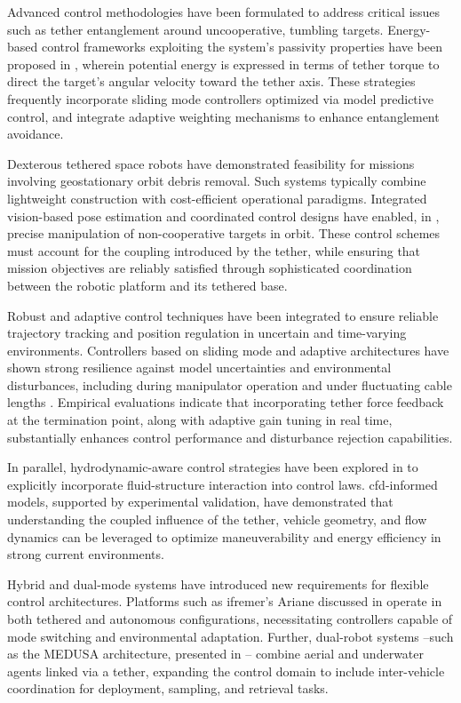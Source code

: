Advanced control methodologies have been formulated to address critical issues such as tether
entanglement around uncooperative, tumbling targets. Energy-based control frameworks exploiting the
system's passivity properties have been proposed in \cite{wangAntitangleControlTethered2019},
wherein potential energy is expressed in terms of tether torque to direct the target's angular
velocity toward the tether axis. These strategies frequently incorporate sliding mode controllers
optimized via model predictive control, and integrate adaptive weighting mechanisms to enhance
entanglement avoidance.

Dexterous tethered space robots have demonstrated feasibility for missions involving geostationary
orbit debris removal. Such systems typically combine lightweight construction with cost-efficient
operational paradigms. Integrated vision-based pose estimation and coordinated control designs have
enabled, in \cite{huangDexterousTetheredSpace2017}, precise manipulation of non-cooperative targets
in orbit. These control schemes must account for the coupling introduced by the tether, while
ensuring that mission objectives are reliably satisfied through sophisticated coordination between
the robotic platform and its tethered base.

Robust and adaptive control techniques have been integrated to ensure reliable trajectory tracking
and position regulation in uncertain and time-varying environments. Controllers based on sliding
mode and  adaptive architectures have shown strong resilience against model
uncertainties and environmental disturbances, including during manipulator operation and under
fluctuating cable lengths
\parencite{soyluDynamicsControlTethered2010,maaloufNovelApplicationMultivariable2012}. Empirical
evaluations indicate that incorporating tether force feedback at the termination point, along with
adaptive gain tuning in real time, substantially enhances control performance and disturbance
rejection capabilities.

In parallel, hydrodynamic-aware control strategies have been explored in
\cite{wuManeuverabilityHydrodynamicsTethered2021} to explicitly incorporate fluid-structure
interaction into control laws. \Ac{cfd}-informed models, supported by experimental validation, have
demonstrated that understanding the coupled influence of the tether, vehicle geometry, and flow
dynamics can be leveraged to optimize maneuverability and energy efficiency in strong current
environments.

Hybrid and dual-mode systems have introduced new requirements for flexible control architectures.
Platforms such as \ac{ifremer}'s Ariane discussed in \cite{brignoneFirstSeaTrials2015} operate in
both tethered and autonomous configurations, necessitating controllers capable of mode switching
and environmental adaptation. Further, dual-robot systems --such as the MEDUSA architecture,
presented in \cite{debruynMEDUSAMultiEnvironmentDualRobot2020}-- combine aerial and underwater
agents linked via a tether, expanding the control domain to include inter-vehicle coordination for
deployment, sampling, and retrieval tasks.

